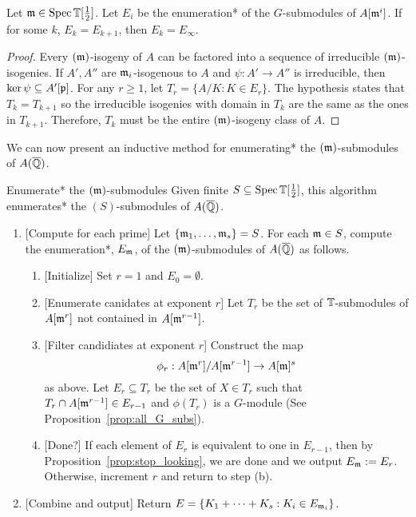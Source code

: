 \documentclass{article}
\begin{document}
\begin{proposition}\label{prop:stop_looking}
    Let $\mathfrak{m}\in \operatorname{Spec} \mathbb{T}[\frac{1}{2}]$. Let $E_i$ be the enumeration* of the
    $G$-submodules of $A[\mathfrak{m}^i]$. If for some $k$, $E_k=E_{k+1}$, then
    $E_k=E_\infty$.
\end{proposition}
\begin{proof}
    Every $(\mathfrak{m})$-isogeny of $A$ can be factored into a sequence of irreducible
    $(\mathfrak{m})$-isogenies. If $A',A''$ are $\mathfrak{m}_i$-isogenous to $A$ and $\psi:A'\to
    A''$ is irreducible, then $\ker\psi\subseteq A'[\mathfrak{p}]$. For any $r\geq 1$,
    let $T_r=\{A/K:K\in E_r\}$. The hypothesis states that $T_k=T_{k+1}$ so the
    irreducible isogenies with domain in $T_k$ are the same as the ones in
    $T_{k+1}$. Therefore, $T_k$ must be the entire $(\mathfrak{m})$-isogeny class of $A$.
\end{proof}

We can now present an inductive method for enumerating* the $(\mathfrak{m})$-submodules of
$A(\overline{\mathbb{Q}})$.
\begin{algorithm}{Enumerate* the $(\mathfrak{m})$-submodules}%
    \label{alg:enumerate_m_submodules}
    Given finite $S\subseteq \operatorname{Spec}\mathbb{T}[\frac{1}{2}]$, this algorithm enumerates* the
    $(S)$-submodules of $A(\overline{\mathbb{Q}})$.
    \begin{enumerate}
        \item{} [Compute for each prime]
            Let $\{\mathfrak{m}_1,\ldots,\mathfrak{m}_s\}=S$. For each $\mathfrak{m}\in S$, compute the
            enumeration*, $E_{\mathfrak{m}}$, of the $(\mathfrak{m})$-submodules of $A(\overline{\mathbb{Q}})$ as
            follows.
            \begin{enumerate}
                \item{} [Initialize] 
                    Set $r=1$ and $E_0=\emptyset$.
                \item{} [Enumerate canidates at exponent $r$]
                    Let $T_r$ be the set of $\mathbb{T}$-submodules of $A[\mathfrak{m}^r]$ not
                    contained in $A[\mathfrak{m}^{r-1}]$.
                \item{} [Filter candidiates at exponent $r$]
                    Construct the map 
                    \[
                        \phi_r:A[\mathfrak{m}^r]/A[\mathfrak{m}^{r-1}]\to A[\mathfrak{m}]^s
                    \]
                    as above. Let $E_r\subseteq T_r$ be the set of $X\in T_r$
                    such that $T_r\cap A[\mathfrak{m}^{r-1}]\in E_{r-1}$ and $\phi(T_r)$
                    is a $G$-module (See Proposition~\ref{prop:all_G_subs}).
                \item{} [Done?]
                    If each element of $E_r$ is equivalent to one in $E_{r-1}$,
                    then by Proposition~\ref{prop:stop_looking}, we are done and
                    we output $E_{\mathfrak{m}} := E_r$. Otherwise, increment $r$ and return to
                    step (b).
            \end{enumerate}
        \item{} [Combine and output]
            Return $E = \{K_1+\cdots+K_s:K_i\in E_{\mathfrak{m}_i}\}$.
    \end{enumerate}
\end{algorithm}
\end{document}
